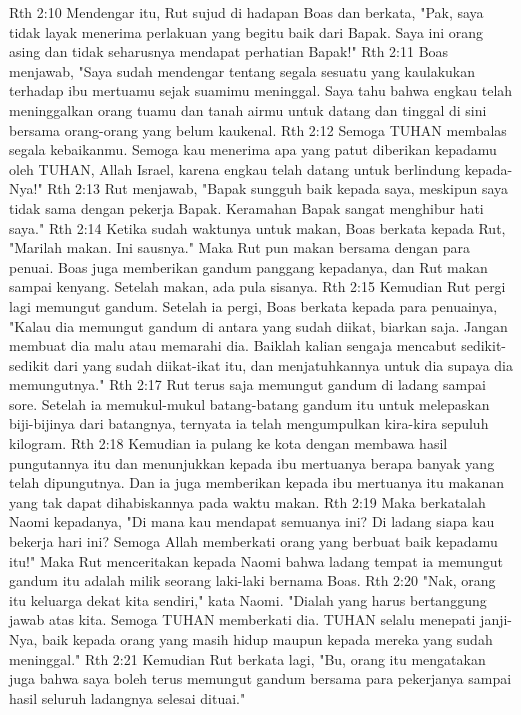 Rth 2:10  Mendengar itu, Rut sujud di hadapan Boas dan berkata, "Pak, saya tidak layak menerima perlakuan yang begitu baik dari Bapak. Saya ini orang asing dan tidak seharusnya mendapat perhatian Bapak!"
Rth 2:11  Boas menjawab, "Saya sudah mendengar tentang segala sesuatu yang kaulakukan terhadap ibu mertuamu sejak suamimu meninggal. Saya tahu bahwa engkau telah meninggalkan orang tuamu dan tanah airmu untuk datang dan tinggal di sini bersama orang-orang yang belum kaukenal.
Rth 2:12  Semoga TUHAN membalas segala kebaikanmu. Semoga kau menerima apa yang patut diberikan kepadamu oleh TUHAN, Allah Israel, karena engkau telah datang untuk berlindung kepada-Nya!"
Rth 2:13  Rut menjawab, "Bapak sungguh baik kepada saya, meskipun saya tidak sama dengan pekerja Bapak. Keramahan Bapak sangat menghibur hati saya."
Rth 2:14  Ketika sudah waktunya untuk makan, Boas berkata kepada Rut, "Marilah makan. Ini sausnya." Maka Rut pun makan bersama dengan para penuai. Boas juga memberikan gandum panggang kepadanya, dan Rut makan sampai kenyang. Setelah makan, ada pula sisanya.
Rth 2:15  Kemudian Rut pergi lagi memungut gandum. Setelah ia pergi, Boas berkata kepada para penuainya, "Kalau dia memungut gandum di antara yang sudah diikat, biarkan saja. Jangan membuat dia malu atau memarahi dia. Baiklah kalian sengaja mencabut sedikit-sedikit dari yang sudah diikat-ikat itu, dan menjatuhkannya untuk dia supaya dia memungutnya."
Rth 2:17  Rut terus saja memungut gandum di ladang sampai sore. Setelah ia memukul-mukul batang-batang gandum itu untuk melepaskan biji-bijinya dari batangnya, ternyata ia telah mengumpulkan kira-kira sepuluh kilogram.
Rth 2:18  Kemudian ia pulang ke kota dengan membawa hasil pungutannya itu dan menunjukkan kepada ibu mertuanya berapa banyak yang telah dipungutnya. Dan ia juga memberikan kepada ibu mertuanya itu makanan yang tak dapat dihabiskannya pada waktu makan.
Rth 2:19  Maka berkatalah Naomi kepadanya, "Di mana kau mendapat semuanya ini? Di ladang siapa kau bekerja hari ini? Semoga Allah memberkati orang yang berbuat baik kepadamu itu!" Maka Rut menceritakan kepada Naomi bahwa ladang tempat ia memungut gandum itu adalah milik seorang laki-laki bernama Boas.
Rth 2:20  "Nak, orang itu keluarga dekat kita sendiri," kata Naomi. "Dialah yang harus bertanggung jawab atas kita. Semoga TUHAN memberkati dia. TUHAN selalu menepati janji-Nya, baik kepada orang yang masih hidup maupun kepada mereka yang sudah meninggal."
Rth 2:21  Kemudian Rut berkata lagi, "Bu, orang itu mengatakan juga bahwa saya boleh terus memungut gandum bersama para pekerjanya sampai hasil seluruh ladangnya selesai dituai."
